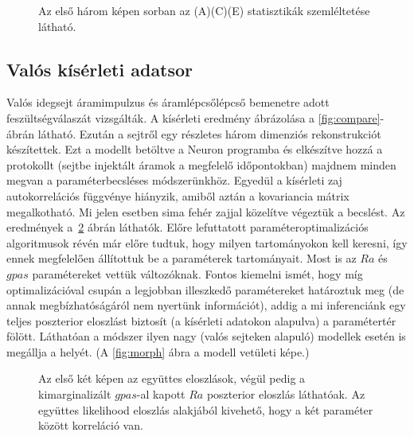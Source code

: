 \begin{figure}
	\hfill
	\hfill
	\hfill
	\vfill
	\caption[Kétkompartmentumos, színes zaj, két paraméter statisztika]{Az első három képen sorban az (A)(C)(E) statisztikák szemléltetése látható.}%
	\label{fig:cn2-stat}
\end{figure}








\FloatBarrier
\subsection{Valós kísérleti adatsor}
Valós idegsejt áramimpulzus és áramlépcsőlépcső bemenetre adott feszültségválaszát vizsgálták. A kísérleti eredmény ábrázolása a \ref{fig:compare}-ábrán látható. Ezután a sejtről egy részletes három dimenziós rekonstrukciót készítettek. Ezt a modellt betöltve a Neuron programba és elkészítve hozzá a protokollt (sejtbe injektált áramok a megfelelő időpontokban) majdnem minden megvan a paraméterbecsléses módszerünkhöz. Egyedül a kísérleti zaj autokorrelációs függvénye hiányzik, amiből aztán a kovariancia mátrix megalkotható. Mi jelen esetben sima fehér zajjal közelítve végeztük a becslést. Az eredmények a~\ref{fig:exp} ábrán láthatók.
Előre lefuttatott paraméteroptimalizációs algoritmusok révén már előre tudtuk, hogy milyen tartományokon kell keresni, így ennek megfelelően állítottuk be a paraméterek tartományait. Most is az $Ra$ és $gpas$ paramétereket vettük változóknak. Fontos kiemelni ismét, hogy míg optimalizációval csupán a legjobban illeszkedő paramétereket határoztuk meg (de annak megbízhatóságáról nem nyertünk információt), addig a mi inferenciánk egy teljes poszterior eloszlást biztosít (a kísérleti adatokon alapulva) a paramétertér fölött. Láthatóan a módszer ilyen nagy (valós sejteken alapuló) modellek esetén is megállja a helyét. (A \ref{fig:morph} ábra a modell vetületi képe.)

\begin{figure}
	\hfill
	\hfill
	\hfill
	\vfill
	\caption[Kísérleti adatok fehér zajjal közelítve]{Az első két képen az együttes eloszlások, végül pedig a kimarginalizált $gpas$-al kapott $Ra$ poszterior eloszlás láthatóak. Az együttes likelihood eloszlás alakjából kivehető, hogy a két paraméter között korreláció van.}%
	\label{fig:exp}
\end{figure}


